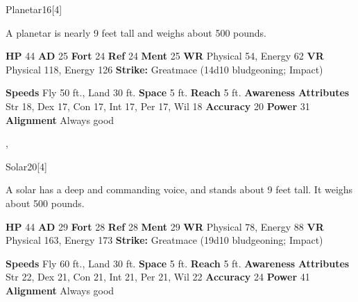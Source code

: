 {{\begin{monsubsection}{Planetar}{16}[4]
    
          A planetar is nearly 9 feet tall and weighs about 500 pounds.
        
    

    \begin{spellcontent}
      \begin{spelltargetinginfo}
        \pari \textbf{HP} 44 \monsep
          \textbf{AD} 25 \monsep
          \textbf{Fort} 24 \monsep
          \textbf{Ref} 24 \monsep
          \textbf{Ment} 25
        \pari \textbf{WR} Physical 54, Energy 62 \monsep
        \textbf{VR} Physical 118, Energy 126
        \pari \textbf{Strike:}
            Greatmace  (14d10 bludgeoning; Impact)
      \end{spelltargetinginfo}
    \end{spellcontent}
    \begin{monsterfooter}
      \pari \textbf{Speeds} Fly 50 ft., Land 30 ft. \monsep
        \textbf{Space} 5 ft. \monsep
        \textbf{Reach} 5 ft.
      \pari \textbf{Awareness} 
      \pari \textbf{Attributes}
        Str 18, Dex 17,
        Con 17, Int 17,
        Per 17, Wil 18
      \pari \textbf{Accuracy} 20 \monsep
        \textbf{Power} 31
      \pari \textbf{Alignment} Always good
    \end{monsterfooter}
  \end{monsubsection}
  
  ,
  \begin{monsubsection}{Solar}{20}[4]
    \vspace{-1em}\vspace{-1em}
    \vspace{0em}

    
          A solar has a deep and commanding voice, and stands about 9 feet tall. It weighs about 500 pounds.
        
    

    \begin{spellcontent}
      \begin{spelltargetinginfo}
        \pari \textbf{HP} 44 \monsep
          \textbf{AD} 29 \monsep
          \textbf{Fort} 28 \monsep
          \textbf{Ref} 28 \monsep
          \textbf{Ment} 29
        \pari \textbf{WR} Physical 78, Energy 88 \monsep
        \textbf{VR} Physical 163, Energy 173
        \pari \textbf{Strike:}
            Greatmace  (19d10 bludgeoning; Impact)
      \end{spelltargetinginfo}
    \end{spellcontent}
    \begin{monsterfooter}
      \pari \textbf{Speeds} Fly 60 ft., Land 30 ft. \monsep
        \textbf{Space} 5 ft. \monsep
        \textbf{Reach} 5 ft.
      \pari \textbf{Awareness} 
      \pari \textbf{Attributes}
        Str 22, Dex 21,
        Con 21, Int 21,
        Per 21, Wil 22
      \pari \textbf{Accuracy} 24 \monsep
        \textbf{Power} 41
      \pari \textbf{Alignment} Always good
    \end{monsterfooter}
  \end{monsubsection}
  
}}

